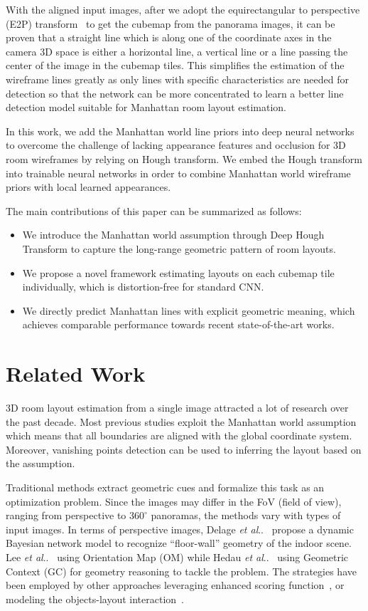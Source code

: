 \documentclass[runningheads]{llncs}
\makeatletter
\DeclareRobustCommand\onedot{\futurelet\@let@token\@onedot}
\def\@onedot{\ifx\@let@token.\else.\null\fi\xspace}
\def\etal{\emph{et al}\onedot}
\makeatother
\begin{document}
With the aligned input images, after we adopt the equirectangular to perspective (E2P) transform~\cite{ng2005data,yang2019dula} to get the cubemap from the panorama images, it can be proven that a straight line which is along one of the coordinate axes in the camera 3D space is either a horizontal line, a vertical line or a line passing the center of the image in the cubemap tiles. This simplifies the estimation of the wireframe lines greatly as only lines with specific characteristics are needed for detection so that the network can be more concentrated to learn a better line detection model suitable for Manhattan room layout estimation. 

In this work, we add the Manhattan world line priors into deep neural networks to overcome the challenge of lacking appearance features and occlusion for 3D room wireframes by relying on Hough transform. We embed the Hough transform into trainable neural networks in order to combine Manhattan world wireframe priors with local learned appearances.

The main contributions of this paper can be summarized as follows: 
\begin{itemize}
    \item We introduce the Manhattan world assumption through Deep Hough Transform to capture the long-range geometric pattern of room layouts.
    \item We propose a novel framework estimating layouts on each cubemap tile individually, which is distortion-free for standard CNN.
    \item We directly predict Manhattan lines with explicit geometric meaning, which achieves comparable performance towards recent state-of-the-art works.
\end{itemize}

%
 \section{Related Work}
3D room layout estimation from a single image attracted a lot of research over the past decade. Most previous studies exploit the Manhattan world assumption~\cite{coughlan1999manhattan} which means that all boundaries are aligned with the global coordinate system. Moreover, vanishing points detection can be used to inferring the layout based on the assumption.

Traditional methods extract geometric cues and formalize this task as an optimization problem. Since the images may differ in the FoV (ﬁeld of view), ranging from perspective to $360^\circ$ panoramas, the methods vary with types of input images.
In terms of perspective images, Delage \etal~\cite{delage2006dynamic} propose a dynamic Bayesian network model to recognize ``floor-wall'' geometry of the indoor scene. Lee \etal~\cite{lee2009geometric} using Orientation Map (OM) while Hedau \etal~\cite{hedau2009recovering} using Geometric Context (GC) for geometry reasoning to tackle the problem. The strategies have been employed by other approaches leveraging enhanced scoring function~\cite{schwing2012efficient,schwing2012efficient2}, or modeling the objects-layout interaction~\cite{del2013understanding,gupta2010estimating,zhao2013scene}.
\end{document}

